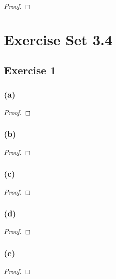 \documentclass[14pt]{extarticle}
\begin{document}
\begin{proof}

\end{proof}

\section{Exercise Set 3.4}

\subsection{Exercise 1}

\subsubsection{(a)}

\begin{proof}

\end{proof}

\subsubsection{(b)}

\begin{proof}

\end{proof}

\subsubsection{(c)}

\begin{proof}

\end{proof}

\subsubsection{(d)}

\begin{proof}

\end{proof}

\subsubsection{(e)}

\begin{proof}

\end{proof}
\end{document}
